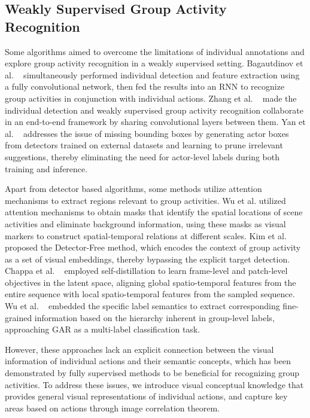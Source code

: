\subsection{Weakly Supervised Group Activity Recognition}
Some algorithms aimed to overcome the limitations of individual annotations and explore group activity recognition in a weakly supervised setting.
Bagautdinov et al. ~\cite{bagautdinov2017social} simultaneously performed individual detection and feature extraction using a fully convolutional network, then fed the results into an RNN to recognize group activities in conjunction with individual actions.
Zhang et al. ~\cite{zhang2019fast} made the individual detection and weakly supervised group activity recognition collaborate in an end-to-end framework by sharing convolutional layers between them.
Yan et al. ~\cite{yan2020sam} addresses the issue of missing bounding boxes by generating actor boxes from detectors trained on external datasets and learning to prune irrelevant suggestions, thereby eliminating the need for actor-level labels during both training and inference. 

Apart from detector based algorithms, some methods utilize attention mechanisms to extract regions relevant to group activities.
Wu et al. \cite{wu2022active} utilized attention mechanisms to obtain masks that identify the spatial locations of scene activities and eliminate background information, using these masks as visual markers to construct spatial-temporal relations at different scales.
Kim et al. ~\cite{kim2022DF} proposed the Detector-Free method, which encodes the context of group activity as a set of visual embeddings, thereby bypassing the explicit target detection. 
Chappa et al. ~\cite{chappa2023spartan} employed self-distillation to learn frame-level and patch-level objectives in the latent space, aligning global spatio-temporal features from the entire sequence with local spatio-temporal features from the sampled sequence.
Wu et al. ~\cite{wu2024learning} embedded the specific label semantics to extract corresponding fine-grained information based on the hierarchy inherent in group-level labels, approaching GAR as a multi-label classification task.

However, these approaches lack an explicit connection between the visual information of individual actions and their semantic concepts, which has been demonstrated by fully supervised methods to be beneficial for recognizing group activities. 
To address these issues, we introduce visual conceptual knowledge that provides general visual representations of individual actions, and capture key areas based on actions through image correlation theorem.